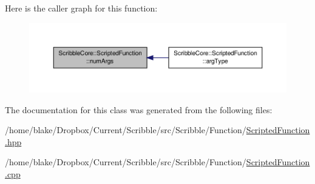 Here is the caller graph for this function\-:
\nopagebreak
\begin{figure}[H]
\begin{center}
\leavevmode
\includegraphics[width=350pt]{class_scribble_core_1_1_scripted_function_a43340a1cf723f2862124eef8d92039f7_icgraph}
\end{center}
\end{figure}




The documentation for this class was generated from the following files\-:\begin{DoxyCompactItemize}
\item 
/home/blake/\-Dropbox/\-Current/\-Scribble/src/\-Scribble/\-Function/\hyperlink{_scripted_function_8hpp}{Scripted\-Function.\-hpp}\item 
/home/blake/\-Dropbox/\-Current/\-Scribble/src/\-Scribble/\-Function/\hyperlink{_scripted_function_8cpp}{Scripted\-Function.\-cpp}\end{DoxyCompactItemize}

